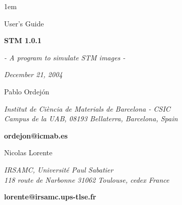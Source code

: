 %
%
%
%



\textheight 22cm
\textwidth 16cm
\oddsidemargin 1mm
\topmargin -15mm

\baselineskip=14pt
\parskip 5pt
\parindent 1em




\begin{titlepage}

\begin{center}

\vspace{1cm}

{\huge {\sc User's Guide}}

\vspace{4cm}

{\Huge {\bf {\sc STM} 1.0.1} }

\vspace{0.5 cm}

{\Large {\it - A program to simulate STM images -}}


{\Large {\it December 21, 2004}}

\vspace{3cm}

{\Large Pablo Ordej\'on}

\vspace{5pt}

{\it Institut de Ci\`encia de Materials de Barcelona - CSIC\\
Campus de la UAB, 08193 Bellaterra, Barcelona, Spain}

\vspace{2pt}
{\bf ordejon@icmab.es}

\vspace{1cm}

\vspace{3cm}
{\Large Nicolas Lorente}

\vspace{5pt}

{\it IRSAMC, 
Universit\'e Paul Sabatier \\
118 route de Narbonne
31062 Toulouse, cedex France
}

\vspace{2pt}
{\bf lorente@irsamc.ups-tlse.fr}

\vspace{7mm}
\end{center}

\end{titlepage}

